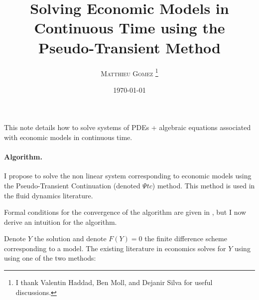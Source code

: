\documentclass[english]{article}
\begin{document}
	\title{Solving Economic Models in Continuous Time using the Pseudo-Transient Method}
	\author{\large{\textsc{Matthieu Gomez \thanks{I thank Valentin Haddad, Ben Moll, and Dejanir Silva for useful discussions.}}}}
	\date{\today}
	\maketitle
	This note details how to solve systems of PDEs + algebraic equations associated with economic models in continuous time.

	\paragraph{Algorithm.}
	I propose to solve the non linear system corresponding to economic models using the Pseudo-Transient Continuation (denoted $\Psi tc$) method. This method is used in the fluid dynamics literature. 
	\par Formal conditions for the convergence of the algorithm are given in  \citet{kelley1998convergence}, but I now derive an intuition for the algorithm.\par
	Denote $Y$  the solution and denote $F(Y) = 0$ the finite difference scheme corresponding to a model. The existing literature in economics solves for $Y$ using using one of the two methods:
\end{document}
